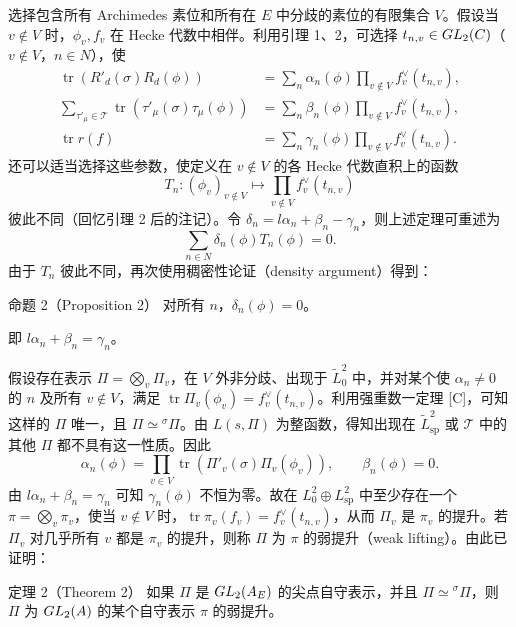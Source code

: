 选择包含所有 Archimedes 素位和所有在 $E$ 中分歧的素位的有限集合 $V$。假设当 $v\notin V$ 时，$\phi_v,f_v$ 在 Hecke 代数中相伴。利用引理 1、2，可选择 $t_{n,v}\in GL_2(C)$（$v\notin V$，$n\in N$），使
\[
 \begin{aligned}
 \operatorname{tr}(R'_d(\sigma)R_d(\phi))
 &=\sum_n\alpha_n(\phi)\prod_{v\notin V}f_v^\vee(t_{n,v}),\\
 \sum_{\tau'_\mu\in\mathcal T}\operatorname{tr}(\tau'_\mu(\sigma)\tau_\mu(\phi))
 &=\sum_n\beta_n(\phi)\prod_{v\notin V}f_v^\vee(t_{n,v}),\\
 \operatorname{tr}r(f)&=\sum_n\gamma_n(\phi)\prod_{v\notin V}f_v^\vee(t_{n,v}).
 \end{aligned}
\]
还可以适当选择这些参数，使定义在 $v\notin V$ 的各 Hecke 代数直积上的函数
\[
 T_n:(\phi_v)_{v\notin V}\longmapsto\prod_{v\notin V}f_v^\vee(t_{n,v})
\]
彼此不同（回忆引理 2 后的注记）。令 $\delta_n=l\alpha_n+\beta_n-\gamma_n$，则上述定理可重述为
\[
 \sum_{n\in N}\delta_n(\phi)T_n(\phi)=0.
\]
由于 $T_n$ 彼此不同，再次使用稠密性论证（density argument）得到：

\begin{originaltheorem}{命题 2（Proposition 2）}
对所有 $n$，$\delta_n(\phi)=0$。
\end{originaltheorem}

即 $l\alpha_n+\beta_n=\gamma_n$。

假设存在表示 $\Pi=\bigotimes_v\Pi_v$，在 $V$ 外非分歧、出现于 $\widetilde L_0^2$ 中，并对某个使 $\alpha_n\ne0$ 的 $n$ 及所有 $v\notin V$，满足 $\operatorname{tr}\Pi_v(\phi_v)=f_v^\vee(t_{n,v})$。利用强重数一定理 [C]，可知这样的 $\Pi$ 唯一，且 $\Pi\simeq{}^\sigma\Pi$。由 $L(s,\Pi)$ 为整函数，得知出现在 $\widetilde L_{\mathrm{sp}}^2$ 或 $\mathcal T$ 中的其他 $\Pi$ 都不具有这一性质。因此
\[
 \alpha_n(\phi)=\prod_{v\in V}\operatorname{tr}(\Pi'_v(\sigma)\Pi_v(\phi_v)),
 \qquad\beta_n(\phi)=0.
\]
由 $l\alpha_n+\beta_n=\gamma_n$ 可知 $\gamma_n(\phi)$ 不恒为零。故在 $L_0^2\oplus L_{\mathrm{sp}}^2$ 中至少存在一个 $\pi=\bigotimes_v\pi_v$，使当 $v\notin V$ 时，$\operatorname{tr}\pi_v(f_v)=f_v^\vee(t_{n,v})$，从而 $\Pi_v$ 是 $\pi_v$ 的提升。若 $\Pi_v$ 对几乎所有 $v$ 都是 $\pi_v$ 的提升，则称 $\Pi$ 为 $\pi$ 的弱提升（weak lifting）。由此已证明：

\begin{originaltheorem}{定理 2（Theorem 2）}
如果 $\Pi$ 是 $GL_2(A_E)$ 的尖点自守表示，并且 $\Pi\simeq{}^\sigma\Pi$，则 $\Pi$ 为 $GL_2(A)$ 的某个自守表示 $\pi$ 的弱提升。
\end{originaltheorem}

